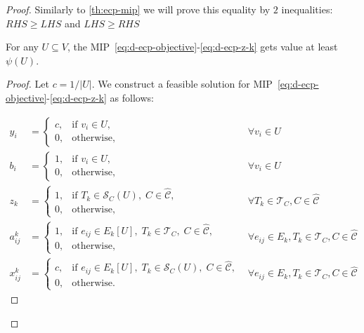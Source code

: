 \begin{proof}
	Similarly to \autoref{th:ecp-mip} we will prove this equality by $2$
	inequalities: $RHS \geq LHS$ and $LHS \geq RHS$

	\begin{claim}
		For any $U \subseteq V$, the
		MIP~\eqref{eq:d-ecp-objective}-\eqref{eq:d-ecp-z-k} gets value at least
		$\psi(U)$.
	\end{claim}

	\begin{proof}
		Let $c = 1 / |U|$. We construct a feasible solution for
		MIP~\eqref{eq:d-ecp-objective}-\eqref{eq:d-ecp-z-k} as follows:

		\begin{align}
			\label{eq:ecpp-y}
			y_i        & = \begin{cases}
				c, & \text{if } v_{i} \in U, \\
				0, & \text{otherwise,}
			\end{cases} \quad & \forall v_i \in U                                \\
			b_i        & = \begin{cases}
				1, & \text{if } v_{i} \in U, \\
				0, & \text{otherwise,}
			\end{cases}\quad  & \forall v_i \in U                                \\
			\label{eq:ecpp-z}
			z_k        & = \begin{cases}
				1, & \text{if } T_{k} \in \mathcal{S}_C(U), \; C \in
				\mathcal{\hat{C}},                                   \\
				0, & \text{otherwise,}
			\end{cases} \quad & \forall T_k \in \mathcal{T}_C, C \in
			\mathcal{\hat{C}}                                                                                  \\
			\label{eq:ecpp-x}
			a_{ij}^{k} & = \begin{cases}
				1, & \text{if } e_{ij} \in E_{k}[U], \; T_{k} \in \mathcal{T} _C, \; C \in
				\mathcal{\hat{C}},                                                         \\
				0, & \text{otherwise,}
			\end{cases} \quad & \forall e_{ij} \in E_k, T_k \in \mathcal{T}_C, C
			\in \mathcal{\hat{C}}                                                                              \\
			x_{ij}^{k} & = \begin{cases}
				c, & \text{if } e_{ij} \in E_{k}[U], \; T_{k} \in \mathcal{S}_C(U), \; C \in
				\mathcal{\hat{C}},                                                           \\
				0, & \text{otherwise.}
			\end{cases}       & \forall e_{ij} \in E_k, T_k \in \mathcal{T}_C, C
			\in \mathcal{\hat{C}}
		\end{align}


\end{proof}
\end{proof}
